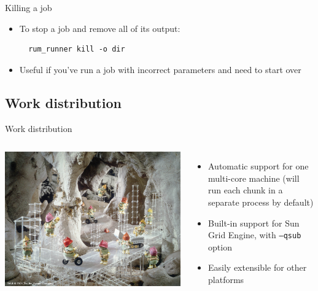 \documentclass{beamer}
\begin{document}
\begin{frame}[fragile]{Killing a job}
\begin{itemize}
\item To stop a job and remove all of its output:
\begin{verbatim}
  rum_runner kill -o dir
\end{verbatim}
\item Useful if you've run a job with incorrect parameters and need to start over
\end{itemize}
\end{frame}

\subsection{Work distribution}

\begin{frame}{Work distribution}
  \begin{columns}
    \column{2.5in}
    \includegraphics[scale=0.4]{doozers.jpg}    
    \column{2.5in}
    \begin{itemize}
    \item Automatic support for one multi-core machine (will run each chunk in a separate process by default)
    \item Built-in support for Sun Grid Engine, with \texttt{--qsub} option
    \item Easily extensible for other platforms
    \end{itemize}
  \end{columns}
\end{frame}
\end{document}
